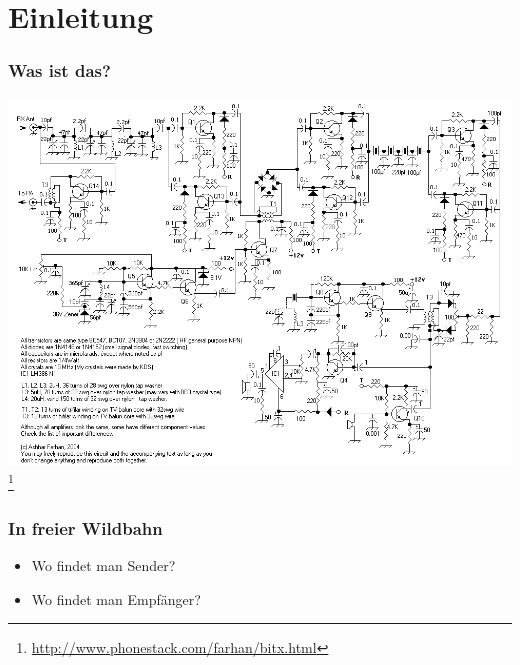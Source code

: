 

\subtitle{Technik 15: \\
           Sender- und Empfängertechnik \\[2em]}
\date{Stand 07.12.2015}



\section*{Einleitung}

\begin{frame}
    \frametitle{Was ist das?}
		\begin{center}
        	\includegraphics[width=.95\textwidth,height=.8\textheight,keepaspectratio]{e15/bitx.png}
        \footnote{\tiny \url{http://www.phonestack.com/farhan/bitx.html}}
	\end{center}
\end{frame}

\begin{frame}
    \frametitle{In freier Wildbahn}
    \begin{itemize}
		\item Wo findet man Sender?
		\item Wo findet man Empfänger?
    \end{itemize}
\end{frame}

